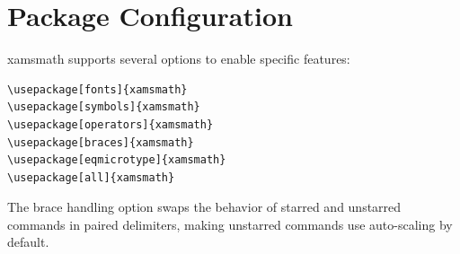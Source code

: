 \documentclass{article}
\begin{document}
\section{Package Configuration}

xamsmath supports several options to enable specific features:

\begin{verbatim}
\usepackage[fonts]{xamsmath}
\usepackage[symbols]{xamsmath}
\usepackage[operators]{xamsmath}
\usepackage[braces]{xamsmath}
\usepackage[eqmicrotype]{xamsmath}
\usepackage[all]{xamsmath}
\end{verbatim}

The brace handling option swaps the behavior of starred and unstarred commands in paired delimiters, making unstarred commands use auto-scaling by default.
\end{document}
